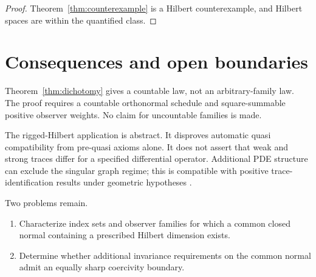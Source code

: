 \documentclass[11pt]{article}
\begin{document}
\begin{proof}
Theorem~\ref{thm:counterexample} is a Hilbert counterexample, and Hilbert
spaces are within the quantified class.
\end{proof}

\section{Consequences and open boundaries}

Theorem~\ref{thm:dichotomy} gives a countable law, not an arbitrary-family
law.  The proof requires a countable orthonormal schedule and square-summable
positive observer weights.  No claim for uncountable families is made.

The rigged-Hilbert application is abstract.  It disproves automatic quasi
compatibility from pre-quasi axioms alone.  It does not assert that weak and
strong traces differ for a specified differential operator.  Additional PDE
structure can exclude the singular graph regime; this is compatible with
positive trace-identification results under geometric hypotheses
\cite{SkrepekPauly2025}.

Two problems remain.
\begin{enumerate}
  \item Characterize index sets and observer families for which a common
  closed normal containing a prescribed Hilbert dimension exists.
  \item Determine whether additional invariance requirements on the common
  normal admit an equally sharp coercivity boundary.
\end{enumerate}
\end{document}
